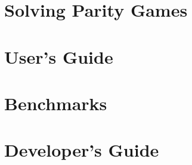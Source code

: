 \documentclass[open=left,twopage=true]{scrreprt}
\begin{document}
\chapter{Solving Parity Games}
\label{chp:pgames}









\chapter{User's Guide}
\label{chp:uguide}









\chapter{Benchmarks}
\label{chp:benchmarks}


%

\chapter{Developer's Guide}
\label{chp:dguide}










\end{document}
